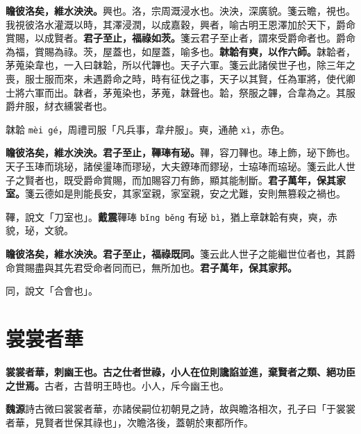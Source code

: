 \textbf{瞻彼洛矣，維水泱泱。}{\footnotesize 興也。洛，宗周溉浸水也。泱泱，深廣貌。箋云瞻，視也。我視彼洛水灌溉以時，其澤浸潤，以成嘉穀，興者，喻古明王恩澤加於天下，爵命賞賜，以成賢者。}\textbf{君子至止，福祿如茨。}{\footnotesize 箋云君子至止者，謂來受爵命者也。爵命為福，賞賜為祿。茨，屋蓋也，如屋蓋，喻多也。}\textbf{韎韐有奭，以作六師。}{\footnotesize 韎韐者，茅蒐染韋也，一入曰韎韐，所以代韠也。天子六軍。箋云此諸侯世子也，除三年之喪，服士服而來，未遇爵命之時，時有征伐之事，天子以其賢，任為軍將，使代卿士將六軍而出。韎者，茅蒐染也，茅蒐，韎聲也。韐，祭服之韠，合韋為之。其服爵弁服，䊷衣纁裳者也。}

\begin{quoting}韎韐 \texttt{mèi gé}，周禮司服「凡兵事，韋弁服」。奭，通赩 \texttt{xì}，赤色。\end{quoting}

\textbf{瞻彼洛矣，維水泱泱。君子至止，鞸琫有珌。}{\footnotesize 鞸，容刀鞸也。琫上飾，珌下飾也。天子玉琫而珧珌，諸侯璗琫而璆珌，大夫鐐琫而鏐珌，士珕琫而珕珌。箋云此人世子之賢者也，既受爵命賞賜，而加賜容刀有飾，顯其能制斷。}\textbf{君子萬年，保其家室。}{\footnotesize 箋云德如是則能長安，其家室親，家室親，安之尤難，安則無篡殺之禍也。}

\begin{quoting}鞸，說文「刀室也」。\textbf{戴震}鞸琫 \texttt{bǐng běng} 有珌 \texttt{bì}，猶上章韎韐有奭，奭，赤貌，珌，文貌。\end{quoting}

\textbf{瞻彼洛矣，維水泱泱。君子至止，福祿既同。}{\footnotesize 箋云此人世子之能繼世位者也，其爵命賞賜盡與其先君受命者同而已，無所加也。}\textbf{君子萬年，保其家邦。}

\begin{quoting}同，說文「合會也」。\end{quoting}

\section{裳裳者華}


\textbf{裳裳者華，刺幽王也。古之仕者世祿，小人在位則讒諂並進，棄賢者之類、絕功臣之世焉。}{\footnotesize 古者，古昔明王時也。小人，斥今幽王也。}

\begin{quoting}\textbf{魏源}詩古微曰裳裳者華，亦諸侯嗣位初朝見之詩，故與瞻洛相次，孔子曰「于裳裳者華，見賢者世保其祿也」，次瞻洛後，蓋朝於東都所作。\end{quoting}

